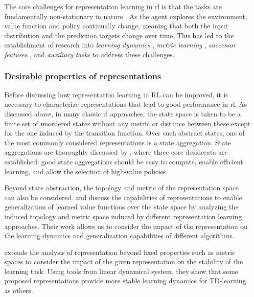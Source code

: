 The core challenges for representation learning in \ac{rl} is that the tasks are fundamentally non-stationary in nature \parencite{kumar2021implicit,nikishin2022primacy}.
As the agent explores the environment, value function and policy continually change, meaning that both the input distribution and the prediction targets change over time.
This has led to the establishment of research into \emph{learning dynamics} \parencite{lyle2022learning,lyle2022understanding}, \emph{metric learning} \parencite{ferns2011bisimulation,zhang2021learning,le2021metrics,kemertas2022approximate}, \emph{successor features} \parencite{barreto2017successor,borsa2018universal}, and \emph{auxiliary tasks} \parencite{jaderberg2017reinforcement,bellemare2019geometric,lyle2021effect,farebrother2023protovalue} to address these challenges.

\subsubsection{Desirable properties of representations}

Before discussing how representation learning in RL can be improved, it is necessary to characterize representations that lead to good performance in \ac{rl}.
As discussed above, in many classic \ac{rl} approaches, the state space is taken to be a finite set of unordered states without any metric or distance between these except for the one induced by the transition function.
Over such abstract states, one of the most commonly considered representations is a state aggregation.
State aggregations are thoroughly discussed by \textcite{abel2020thesis}, where three core desiderata are established: good state aggregations should be easy to compute, enable efficient learning, and allow the selection of high-value policies.

Beyond state abstraction, the topology and metric of the representation space can also be considered. 
\textcite{le2021metrics} and \textcite{lelan2022generalization} discuss the capabilities of representations to enable generalization of learned value functions over the state space by analyzing the induced topology and metric space induced by different representation learning approaches.
Their work allows us to consider the impact of the representation on the learning dynamics and generalization capabilities of different algorithms.

\textcite{ghosh2020representations} extends the analysis of representation beyond fixed properties such as metric spaces to consider the impact of the given representation on the stability of the learning task.
Using tools from linear dynamical system, they show that some proposed representations provide more stable learning dynamics for TD-learning as others.

